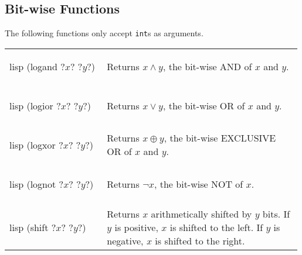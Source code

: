 \documentclass[a4paper, 12pt]{article}
\makeatletter
\newenvironment{funcdefs}
    {\begin{longtable}{@{} x{0.33\linewidth} @{} >{\raggedright\arraybackslash}p{0.66\linewidth} @{}}}
    {\end{longtable}}
\makeatother
\begin{document}
\subsection{Bit-wise Functions}
The following functions only accept \texttt{int}s as arguments.
\begin{funcdefs}
    \begin{minipage}[t]{\linewidth}
        \centering
        \begin{cminted}[autogobble=true, escapeinside=??]{lisp}
            (logand ?$x$? ?$y$?)
        \end{cminted}
    \end{minipage}
    & Returns $x \wedge y$, the bit-wise AND of $x$ and $y$.
    \\ \\
    \begin{minipage}[t]{\linewidth}
        \centering
        \begin{cminted}[autogobble=true, escapeinside=??]{lisp}
            (logior ?$x$? ?$y$?)
        \end{cminted}
    \end{minipage}
    & Returns $x \lor y$, the bit-wise OR of $x$ and $y$.
    \\ \\
    \begin{minipage}[t]{\linewidth}
        \centering
        \begin{cminted}[autogobble=true, escapeinside=??]{lisp}
            (logxor ?$x$? ?$y$?)
        \end{cminted}
    \end{minipage}
    & Returns $x \oplus y$, the bit-wise EXCLUSIVE OR of $x$ and $y$.
    \\ \\
    \begin{minipage}[t]{\linewidth}
        \centering
        \begin{cminted}[autogobble=true, escapeinside=??]{lisp}
            (lognot ?$x$? ?$y$?)
        \end{cminted}
    \end{minipage}
    & Returns $\lnot x$, the bit-wise NOT of $x$.
    \\ \\
    \begin{minipage}[t]{\linewidth}
        \centering
        \begin{cminted}[autogobble=true, escapeinside=??]{lisp}
            (shift ?$x$? ?$y$?)
        \end{cminted}
    \end{minipage}
    & Returns $x$ arithmetically shifted by $y$ bits. If $y$ is positive, $x$ is shifted to the left. If $y$ is negative, $x$ is shifted to the right.
\end{funcdefs}
\end{document}

